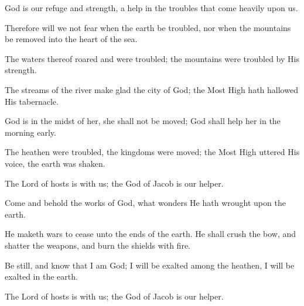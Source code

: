 God is our refuge and strength, a help in the troubles that come heavily upon us.

Therefore will we not fear when the earth be troubled, nor when the mountains be removed into the heart of the sea.

The waters thereof roared and were troubled; the mountains were troubled by His strength.

The streams of the river make glad the city of God; the Most High hath hallowed His tabernacle.

God is in the midst of her, she shall not be moved; God shall help her in the morning early.

The heathen were troubled, the kingdoms were moved; the Most High uttered His voice, the earth was shaken.

The Lord of hosts is with us; the God of Jacob is our helper.

Come and behold the works of God, what wonders He hath wrought upon the earth.

He maketh wars to cease unto the ends of the earth. He shall crush the bow, and shatter the weapons, and burn the shields with fire.

Be still, and know that I am God; I will be exalted among the heathen, I will be exalted in the earth.

The Lord of hosts is with us; the God of Jacob is our helper.

